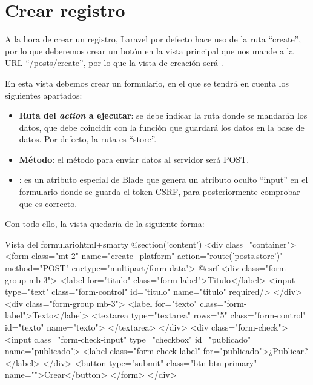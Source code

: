 \chapter{Crear registro}

A la hora de crear un registro, Laravel por defecto hace uso de la ruta “create”, por lo que deberemos crear un botón en la vista principal que nos mande a la URL “/posts/create”, por lo que la vista de creación será .

En esta vista debemos crear un formulario, en el que se tendrá en cuenta los siguientes apartados:

\begin{itemize}
    \item \textbf{Ruta del \textit{action} a ejecutar}: se debe indicar la ruta donde se mandarán los datos, que debe coincidir con la función que guardará los datos en la base de datos. Por defecto, la ruta es “store”.
    \item \textbf{Método}: el método para enviar datos al servidor será POST.
    \item {}: es un atributo especial de Blade que genera un atributo oculto “input” en el formulario donde se guarda el token \href{https://es.wikipedia.org/wiki/Cross-site_request_forgery}{CSRF}, para posteriormente comprobar que es correcto.
\end{itemize}

Con todo ello, la vista quedaría de la siguiente forma:

\begin{mycode}{Vista del formulario}{html+smarty}{{\footnotesize }}
@section('content')
<div class="container">
  <form class="mt-2" name="create_platform" action="{{route('posts.store')}}"
    method="POST" enctype="multipart/form-data">
    @csrf
    <div class="form-group mb-3">
      <label for="titulo" class="form-label">Titulo</label>
      <input type="text" class="form-control" id="titulo" name="titulo" required/>
    </div>
    <div class="form-group mb-3">
      <label for="texto" class="form-label">Texto</label>
      <textarea type="textarea" rows="5" class="form-control" id="texto" name="texto">
      </textarea>
    </div>
    <div class="form-check">
      <input class="form-check-input" type="checkbox" id="publicado" name="publicado">
      <label class="form-check-label" for="publicado">¿Publicar?
      </label>
    </div>
  <button type="submit" class="btn btn-primary" name="">Crear</button>
</form>
</div>
\end{mycode}


